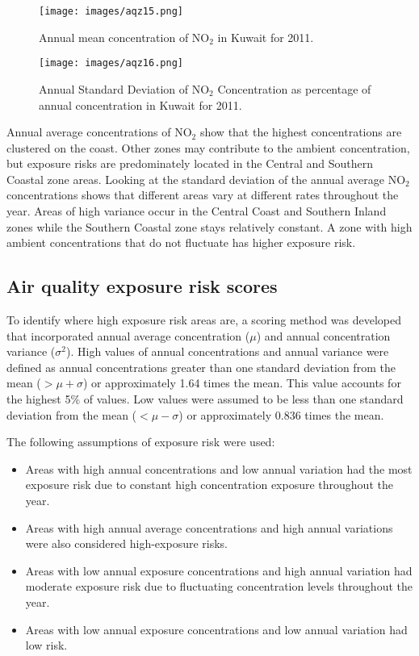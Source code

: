 %
\begin{figure}[H]
\centering
\texttt{[image: images/aqz15.png]} 
\caption{Annual mean concentration of NO$_{2}$ in Kuwait for 2011.}
\label{fig:15meanNO2}
\end{figure}
%
%
\begin{figure}[H]
\centering
\texttt{[image: images/aqz16.png]} 
\caption[Annual Standard Deviation of NO$_{2}$ Concentration]{Annual Standard Deviation of NO$_{2}$ Concentration as percentage of annual concentration in Kuwait for 2011.}
\label{fig:16stdNO2}
\end{figure}
%

Annual average concentrations of NO$_{2}$ show that the highest concentrations are clustered on the coast. Other zones may contribute to the ambient concentration, but exposure risks are predominately located in the Central and Southern Coastal zone areas.  Looking at the standard deviation of the annual average NO$_{2}$ concentrations shows that different areas vary at different rates throughout the year. Areas of high variance occur in the Central Coast and Southern Inland zones while the Southern Coastal zone stays relatively constant.  A zone with high ambient concentrations that do not fluctuate has higher exposure risk. 

\subsection{Air quality exposure risk scores}

To identify where high exposure risk areas are, a scoring method was developed that incorporated annual average concentration ($\mu$) and annual concentration variance ($\sigma^{2}$).  High values of annual concentrations and annual variance were defined as annual concentrations greater than one standard deviation from the mean ($> \mu + \sigma$) or approximately 1.64 times the mean. This value accounts for the highest 5\% of values. Low values were assumed to be less than one standard deviation from the mean ($< \mu - \sigma$) or approximately 0.836 times the mean.

The following assumptions of exposure risk were used:
\begin{itemize}
\item Areas with high annual concentrations and low annual variation had the most exposure risk due to constant high concentration exposure throughout the year.
\item Areas with high annual average concentrations and high annual variations were also considered high-exposure risks.
\item Areas with low annual exposure concentrations and high annual variation had moderate exposure risk due to fluctuating concentration levels throughout the year.
\item Areas with low annual exposure concentrations and low annual variation had low risk.
\end{itemize}


